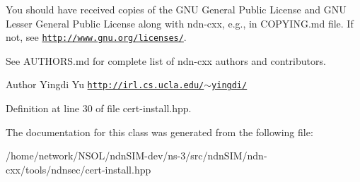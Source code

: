 You should have received copies of the G\+NU General Public License and G\+NU Lesser General Public License along with ndn-\/cxx, e.\+g., in C\+O\+P\+Y\+I\+N\+G.\+md file. If not, see \href{http://www.gnu.org/licenses/}{\tt http\+://www.\+gnu.\+org/licenses/}.

See A\+U\+T\+H\+O\+R\+S.\+md for complete list of ndn-\/cxx authors and contributors.

\begin{DoxyAuthor}{Author}
Yingdi Yu \href{http://irl.cs.ucla.edu/~yingdi/}{\tt http\+://irl.\+cs.\+ucla.\+edu/$\sim$yingdi/} 
\end{DoxyAuthor}


Definition at line 30 of file cert-\/install.\+hpp.



The documentation for this class was generated from the following file\+:\begin{DoxyCompactItemize}
\item 
/home/network/\+N\+S\+O\+L/ndn\+S\+I\+M-\/dev/ns-\/3/src/ndn\+S\+I\+M/ndn-\/cxx/tools/ndnsec/cert-\/install.\+hpp\end{DoxyCompactItemize}
